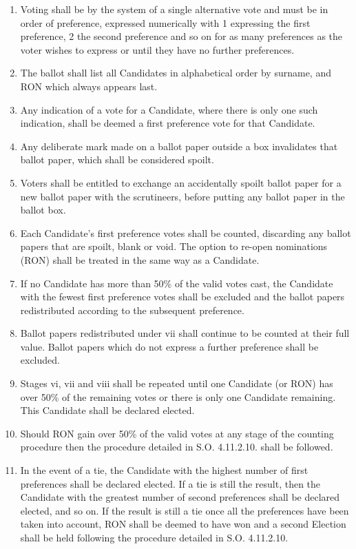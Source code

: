 \begin{enumerate}
\item Voting shall be by the system of a single alternative vote and must be in order of preference, expressed numerically with 1 expressing the first preference, 2 the second preference and so on for as many preferences as the voter wishes to express or until they have no further preferences.
\item The ballot shall list all Candidates in alphabetical order by surname, and RON which always appears last.
\item Any indication of a vote for a Candidate, where there is only one such indication, shall be deemed a first preference vote for that Candidate.
\item Any deliberate mark made on a ballot paper outside a box invalidates that ballot paper, which shall be considered spoilt.
\item Voters shall be entitled to exchange an accidentally spoilt ballot paper for a new ballot paper with the scrutineers, before putting any ballot paper in the ballot box.
\item Each Candidate's first preference votes shall be counted, discarding any ballot papers that are spoilt, blank or void. The option to re-open nominations (RON) shall be treated in the same way as a Candidate.
\item If no Candidate has more than 50\% of the valid votes cast, the Candidate with the fewest first preference votes shall be excluded and the ballot papers redistributed according to the subsequent preference.
\item Ballot papers redistributed under vii shall continue to be counted at their full value. Ballot papers which do not express a further preference shall be excluded.
\item Stages vi, vii and viii shall be repeated until one Candidate (or RON) has over 50\% of the remaining votes or there is only one Candidate remaining. This Candidate shall be declared elected.
\item Should RON gain over 50\% of the valid votes at any stage of the counting procedure then the procedure detailed in S.O. 4.11.2.10. shall be followed.
\item In the event of a tie, the Candidate with the highest number of first preferences shall be declared elected. If a tie is still the result, then the Candidate with the greatest number of second preferences shall be declared elected, and so on. If the result is still a tie once all the preferences have been taken into account, RON shall be deemed to have won and a second Election shall be held following the procedure detailed in S.O. 4.11.2.10.
\end{enumerate}
